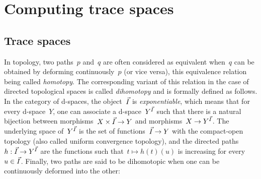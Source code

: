 \documentclass[orivec]{llncs} \usepackage[T1]{fontenc}
\newcommand{\comment}[1]{}
\begin{document}
\comment{
The fact that the definition of the geometric semantics resembles a lot the
trace semantics introduced in Section~\ref{sec:ts} can be explained by the fact
that it is in fact a ``geometrization'' of the trace semantics. Namely, if we
see a vertex as a point, an edge as a directed segment~$\dui$, an independence
tile as a directed square~$\dui\times\dui$, and glue these topological spaces
according to how they are connected in the asynchronous graphs, then we recover
a subset of the geometric semantics (this process can be formally expressed
category using a coend): this process is called the \emph{geometric realization}
of a cubical set.
In particular, this implies that the schedulings in trace and geometric semantics
are essentially the same:
\begin{proposition}
  Given a program~$p$, there is a (well-behaved) injection~$\iota$ from the set
  of total paths of the trace semantics of~$p$ to the set of total paths of the
  geometric semantics of~$p$. Moreover, every total path in the geometric
  semantics is dihomotopic to a total path in the image of~$\iota$; and two
  total paths in the trace semantics are dihomotopic if and only if their images
  under~$\iota$ are dihomotopic.
\end{proposition}
The notion of dihomotopy in geometric semantics is formally introduced in
Definition~\ref{def:dihomotopy} below. We call any total path in the image
of~$\iota$, dihomotopic to~$p$ in the geometric semantics, a \emph{lifting}
of~$p$.
}

\section{Computing trace spaces}
\label{computing}
\subsection{Trace spaces}
\label{tracespaces}
In topology, two paths~$p$ and~$q$ are often considered as equivalent when~$q$
can be obtained by deforming continuously~$p$ (or vice versa), this equivalence
relation being called \emph{homotopy}. The corresponding variant of this
relation in the case of directed topological spaces is called \emph{dihomotopy}
and is formally defined as follows. In the category of d-spaces, the
object~$\dui$ is \emph{exponentiable}, which means that for every d-space~$Y$,
one can associate a d-space~$Y^{\vec{I}}$ such that there is a natural bijection
between morphisms~$X\times\vec{I}\to Y$ and morphisms~$X\to Y^{\vec{I}}$. The
underlying space of~$Y^{\vec{I}}$ is the set of functions~$\vec{I}\to Y$ with the
compact-open topology (also called uniform convergence topology), and the
directed paths \hbox{$h:\vec{I}\to Y^{\vec{I}}$} are the functions such that~$t\mapsto
h(t)(u)$ is increasing for every~$u\in\vec{I}$. Finally, two paths are said to be
dihomotopic when one can be continuously deformed into the other:
\end{document}
